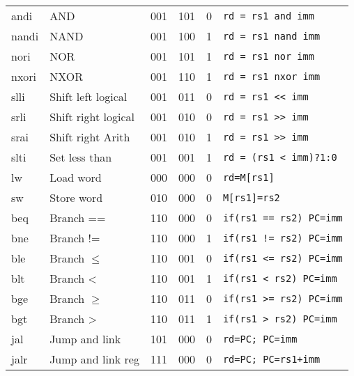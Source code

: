 \documentclass[a4paper]{article}
\begin{document}
\begin{tabular}{|l|l|c|c|c|l|}
        andi  & AND                  & 001    & 101    & 0      & \texttt{rd = rs1 and imm}   \\
        nandi & NAND                 & 001    & 100    & 1      & \texttt{rd = rs1 nand imm}    \\
        nori  & NOR                  & 001    & 101    & 1      & \texttt{rd = rs1 nor imm}     \\
        nxori & NXOR                 & 001    & 110    & 1      & \texttt{rd = rs1 nxor imm}    \\
        slli  & Shift left logical   & 001    & 011    & 0      & \texttt{rd = rs1 << imm}      \\
        srli  & Shift right logical  & 001    & 010    & 0      & \texttt{rd = rs1 >> imm}      \\
        srai  & Shift right Arith    & 001    & 010    & 1      & \texttt{rd = rs1 >> imm}      \\
        slti  & Set less than        & 001    & 001    & 1      & \texttt{rd = (rs1 < imm)?1:0} \\
        \hline
        lw    & Load word            & 000    & 000    & 0      & \texttt{rd=M[rs1]}            \\
        sw    & Store word           & 010    & 000    & 0      & \texttt{M[rs1]=rs2}           \\
        \hline
        beq   & Branch ==            & 110    & 000    & 0      & \texttt{if(rs1 == rs2) PC=imm}\\
        bne   & Branch !=            & 110    & 000    & 1      & \texttt{if(rs1 != rs2) PC=imm}\\
        ble   & Branch \(\leqslant\) & 110    & 001    & 0      & \texttt{if(rs1 <= rs2) PC=imm}\\
        blt   & Branch <             & 110    & 001    & 1      & \texttt{if(rs1 < rs2) PC=imm} \\
        bge   & Branch \(\geqslant\) & 110    & 011    & 0      & \texttt{if(rs1 >= rs2) PC=imm}\\
        bgt   & Branch >             & 110    & 011    & 1      & \texttt{if(rs1 > rs2) PC=imm} \\

        \hline
        jal  & Jump and link        & 101    & 000    & 0      &\texttt{rd=PC; PC=imm}         \\
        jalr & Jump and link reg    & 111    & 000    & 0      &\texttt{rd=PC; PC=rs1+imm}     \\
        \hline
    \end{tabular}
    
\end{document}
